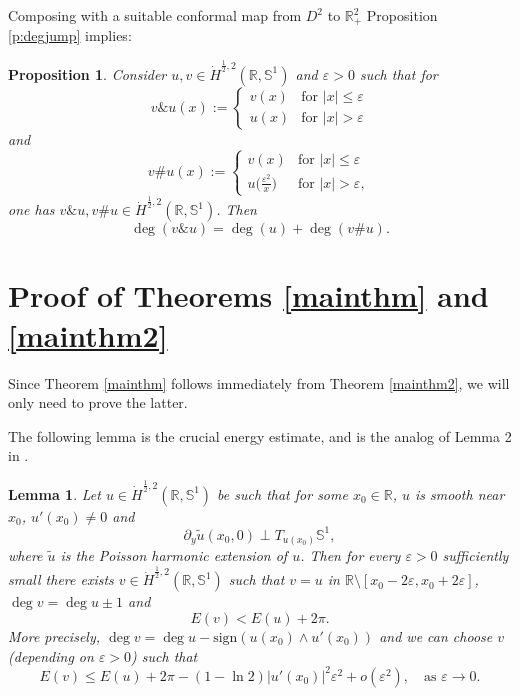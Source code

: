 \documentclass[12pt, a4paper]{article}
\newtheorem{lem}[thm]{Lemma}
\newtheorem{prop}[thm]{Proposition}
\newcommand{\sph}{\mathbb{S}}
\newcommand{\R}{\mathbb{R}}
\newcommand{\ve}{\varepsilon}
\renewcommand{\(}{\left(}
\renewcommand{\)}{\right)}
\begin{document}
Composing with a suitable conformal map from $D^2$ to $\R^2_+$
Proposition \ref{p:degjump} implies:

\begin{prop}\label{p:degjump2} Consider $u,v \in \dot H^{\frac{1}{2},2}(\R,\sph^1)$ and $\ve>0$ such that for
\[v\&u(x):=
\begin{cases}
v(x) &\text{for }|x|\le \ve \\
u(x) &\text{for }|x|>\ve
\end{cases}\]
and
\[v\# u(x):=
\begin{cases}
v(x) &\text{for }|x|\le \ve\\
u\big(\frac{\ve^2}{x}\big) &\text{for }|x|>\ve,
\end{cases}\]
one has $v\&u, v\#u\in \dot H^{\frac{1}{2},2}(\R,\sph^1)$. Then
\begin{equation}\label{eq:jump}
\deg(v\&u)= \deg(u)+\deg (v\#u).
\end{equation}
\end{prop}








\section{Proof of Theorems \ref{mainthm} and \ref{mainthm2}}

Since Theorem \ref{mainthm} follows immediately from Theorem \ref{mainthm2}, we will only need to prove the latter.

The following lemma is the crucial energy estimate, and is the analog of Lemma 2 in \cite{bc}.

\begin{lem}\label{strictestimate} Let $u\in \dot H^{\frac{1}{2},2}(\R,\sph^1)$ be such that for some $x_0\in \R$, $u$ is smooth near $x_0$, $u'(x_0)\ne 0$ and 
\begin{equation}\label{12harm}
\partial_y \tilde u(x_0,0)\perp T_{u(x_0)}\sph^1,
\end{equation}
where $\tilde u$ is the Poisson harmonic extension of $u$.
Then for every $\ve>0$ sufficiently small there exists $v \in \dot H^{\frac{1}{2},2}(\R,\sph^1)$ such that $v=u$ in $\R\setminus [x_0-2\ve,x_0+2\ve]$, $\deg v= \deg u\pm1$ and
$$E(v)< E(u)+2\pi.$$ More precisely,
$\deg v= \deg u- \mathrm{sign}(u(x_0)\wedge u'(x_0))$ and we can choose $v$ (depending on $\ve>0$) such that
$$E(v)\le E(u)+2\pi -(1-\ln 2)|u'(x_0)|^2\ve^2+o(\ve^2),\quad \text{as }\ve\to 0.$$
\end{lem}
\end{document}
